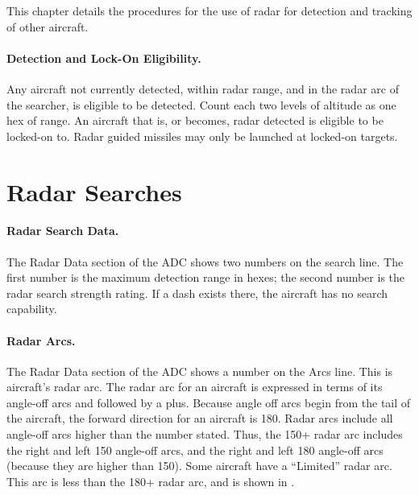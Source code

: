 \label{rule:air-to-air-radar}


This chapter details the procedures for the use of radar for detection and tracking of other aircraft.

\paragraph{Detection and Lock-On Eligibility.} Any aircraft not currently detected, within radar range, and in the radar arc of the searcher, is eligible to be detected. Count each two levels of altitude as one hex of range. An aircraft that is, or becomes, radar detected is eligible to be locked-on to. Radar guided missiles may only be launched at locked-on targets.

\section{Radar Searches}
\label{rule:normal-mode-searching}

\paragraph{Radar Search Data.} The Radar Data section of the ADC shows two numbers on the search line. The first number is the maximum detection range in hexes; the second number is the radar search strength rating. If a dash exists there, the aircraft has no search capability.


\paragraph{Radar Arcs.} The Radar Data section of the ADC shows a number on the Arcs line. This is aircraft's radar arc. The radar arc for an aircraft is expressed in terms of its angle-off arcs and followed by a plus. Because angle off arcs begin from the tail of the aircraft, the forward direction for an aircraft is 180{\deg}.  Radar arcs include all angle-off arcs higher than the number stated. Thus, the 150+ radar arc includes the right and left 150{\deg} angle-off arcs, and the right and left 180{\deg} angle-off arcs (because they are higher than 150{\deg}). Some aircraft have a “Limited” radar arc. This arc is less than the 180+ radar arc, and is shown in . 

